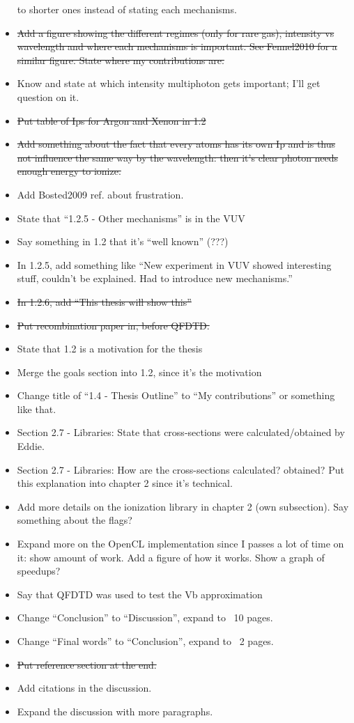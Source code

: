 \begin{itemize}
to shorter ones instead of stating each mechanisms.
\item \sout{Add a figure showing the different regimes (only for rare gas), intensity
vs wavelength and where each mechanisms is important. See Fennel2010 for a
similar figure. State where my contributions are.}
\item Know and state at which intensity multiphoton gets important; I'll get
question on it.
\item \sout{Put table of Ips for Argon and Xenon in 1.2}
\item \sout{Add something about the fact that every atoms has its own Ip and is thus
not influence the same way by the wavelength: then it's clear photon needs
enough energy to ionize.}
\item Add Bosted2009 ref. about frustration.
\item State that ``1.2.5 - Other mechanisms'' is in the VUV
\item Say something in 1.2 that it's ``well known'' (???)
\item In 1.2.5, add something like ``New experiment in VUV showed interesting
stuff, couldn't be explained. Had to introduce new mechanisms.''
\item \sout{In 1.2.6, add ``This thesis will show this''}
\item \sout{Put recombination paper in, before QFDTD.}
\item State that 1.2 is a motivation for the thesis
\item Merge the goals section into 1.2, since it's the motivation
\item Change title of ``1.4 - Thesis Outline'' to ``My contributions'' or
something like that.
\item Section 2.7 - Libraries: State that cross-sections were calculated/obtained
by Eddie.
\item Section 2.7 - Libraries: How are the cross-sections calculated? obtained?
Put this explanation into chapter 2 since it's technical.
\item Add more details on the ionization library in chapter 2 (own subsection).
Say something about the flags?
\item Expand more on the OpenCL implementation since I passes a lot of time on
it: show amount of work. Add a figure of how it works. Show a graph of speedups?
\item Say that QFDTD was used to test the Vb approximation
\item Change ``Conclusion'' to ``Discussion'', expand to ~10 pages.
\item Change ``Final words'' to ``Conclusion'', expand to ~2 pages.
\item \sout{Put reference section at the end.}
\item Add citations in the discussion.
\item Expand the discussion with more paragraphs.
\end{itemize}

